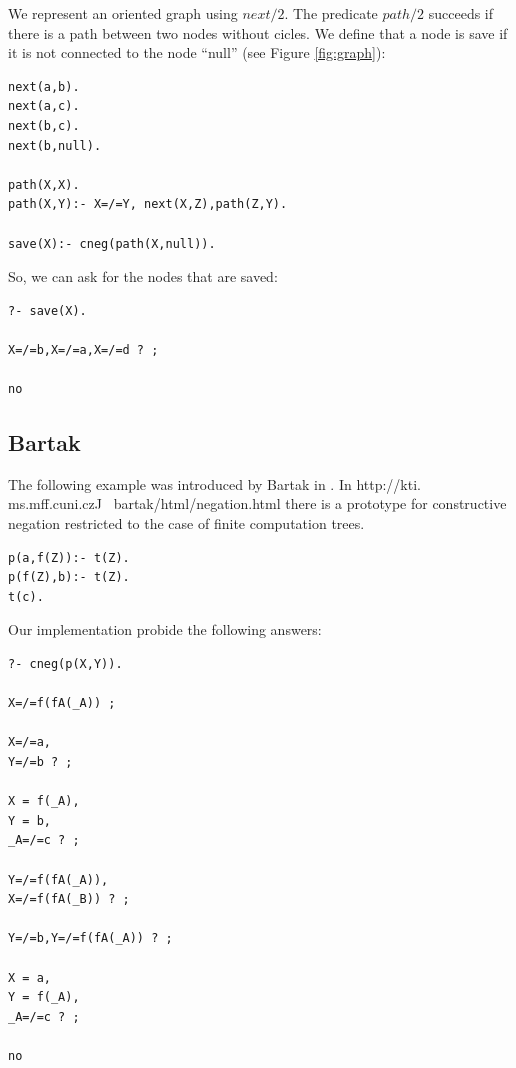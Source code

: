 \documentclass{tlp}
\begin{document}
We represent an oriented graph using $next/2$. The predicate $path/2$ succeeds
if there is a path between two nodes without cicles. We define that a node is
save if it is not connected to the node ``null'' (see Figure \ref{fig:graph}):

\begin{small}
\begin{verbatim}
next(a,b).
next(a,c).
next(b,c).
next(b,null).

path(X,X).
path(X,Y):- X=/=Y, next(X,Z),path(Z,Y).

save(X):- cneg(path(X,null)).
\end{verbatim}
\end{small}
So, we can ask for the nodes that are saved:
\begin{small}
\begin{verbatim}
?- save(X).

X=/=b,X=/=a,X=/=d ? ;

no
\end{verbatim}
\end{small}

\subsection*{Bartak}

The following example was introduced by Bartak in \cite{Bartak}. In
http://kti. ms.mff.cuni.czJ ~bartak/html/negation.html there is a prototype
for constructive negation restricted to the case of finite computation trees.

\begin{small}
\begin{verbatim}
p(a,f(Z)):- t(Z).
p(f(Z),b):- t(Z).
t(c).
\end{verbatim}
\end{small}

Our implementation probide the following answers:

\begin{small}
\begin{verbatim}
?- cneg(p(X,Y)).

X=/=f(fA(_A)) ;

X=/=a,
Y=/=b ? ;

X = f(_A),
Y = b,
_A=/=c ? ;

Y=/=f(fA(_A)),
X=/=f(fA(_B)) ? ;

Y=/=b,Y=/=f(fA(_A)) ? ;

X = a,
Y = f(_A),
_A=/=c ? ;

no
\end{verbatim}
\end{small}
\end{document}
